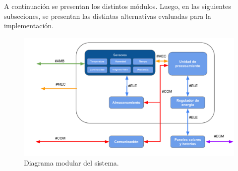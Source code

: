 




A continuación se presentan los distintos módulos. Luego, en las siguientes subseciones, se presentan las distintas alternativas evaluadas para la implementación.

\begin{figure}[H]
	\centering
	\includegraphics[width=0.9\linewidth]{ImagenesFactibilidad/EsquemaModular}
	\caption{Diagrama modular del sistema.}
	\label{fig:esquema_modular}
\end{figure}





%















